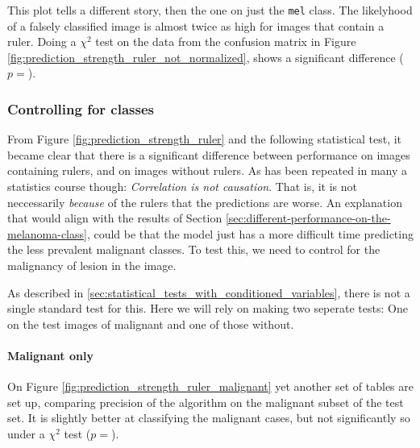 This plot tells a different story, then the one on just the \verb|mel| class.
The likelyhood of a falsely classified image is almost twice as high for images
that contain a ruler.
Doing a $\chi^2$ test on the data from the confusion matrix in Figure \ref{fig:prediction_strength_ruler_not_normalized},
shows a significant difference ($p=$).

\subsubsection{Controlling for classes}
From Figure \ref{fig:prediction_strength_ruler} and the following statistical test,
it became clear that there is a significant difference between performance on images containing rulers,
and on images without rulers.
As has been repeated in many a statistics course though:
\textit{Correlation is not causation}.
That is, it is not neccessarily \textit{because} of the rulers that the predictions are worse.
An explanation that would align with the results of Section \ref{sec:different-performance-on-the-melanoma-class},
could be that the model just has a more difficult time predicting the less prevalent malignant classes.
To test this, we need to control for the malignancy of lesion in the image.

As described in \ref{sec:statistical_tests_with_conditioned_variables}, there is not
a single standard test for this.
Here we will rely on making two seperate tests:
One on the test images of malignant and one of those without.

\paragraph{Malignant only}
On Figure \ref{fig:prediction_strength_ruler_malignant} yet another set of tables are set up,
comparing precision of the algorithm on the malignant subset of the test set.
It is slightly better at classifying the malignant cases, but not
significantly so under a $\chi^2$ test ($p=$).

